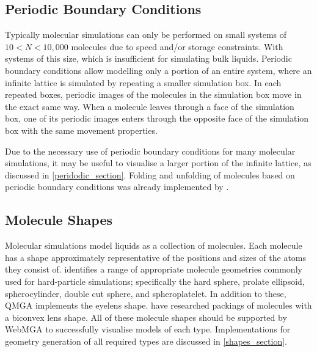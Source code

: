 \subsection{Periodic Boundary Conditions}
\label{pbc_explain}
Typically molecular simulations can only be performed on small systems of $10<N<10,000$ molecules due to speed and/or storage constraints. With systems of this size, which is insufficient for simulating bulk liquids. Periodic boundary conditions allow modelling only a portion of an entire system\cite{gabriel2008molecular}, where an infinite lattice is simulated by repeating a smaller simulation box\cite{wu2014applying}. In each repeated boxes, periodic images of the molecules in the simulation box move in the exact same way. When a molecule leaves through a face of the simulation box, one of its periodic images enters through the opposite face of the simulation box with the same movement properties.

Due to the necessary use of periodic boundary conditions for many molecular simulations, it may be useful to visualise a larger portion of the infinite lattice, as discussed in \cref{peridodic_section}. Folding and unfolding of molecules based on periodic boundary conditions was already implemented by \textcite{webmga_2}.

\subsection{Molecule Shapes}
Molecular simulations model liquids as a collection of molecules. Each molecule has a shape approximately representative of the positions and sizes of the atoms they consist of. \textcite{allen2019molecular} identifies a range of appropriate molecule geometries commonly used for hard-particle simulations; specifically the hard sphere, prolate ellipsoid, spherocylinder, double cut sphere, and spheroplatelet. In addition to these, QMGA implements the eyelens shape. \textcite{cinacchi2019hard} have researched packings of molecules with a biconvex lens shape. All of these molecule shapes should be supported by WebMGA to successfully visualise models of each type. Implementations for geometry generation of all required types are discussed in \cref{shapes_section}.
